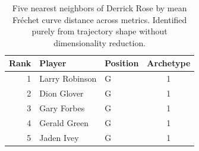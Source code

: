 \begin{table}[htbp]
  \centering\small
  \begin{tabular}{rllc}
    \toprule
    Rank & Player & Position & Archetype \\
    \midrule
    1 & Larry Robinson & G & 1 \\
    2 & Dion Glover & G & 1 \\
    3 & Gary Forbes & G & 1 \\
    4 & Gerald Green & G & 1 \\
    5 & Jaden Ivey & G & 1 \\
    \bottomrule
  \end{tabular}
  \caption{Five nearest neighbors of Derrick Rose by mean Fr\'{e}chet curve distance across metrics. Identified purely from trajectory shape without dimensionality reduction.}
  \label{tab:Derrick_Rose_frechet_curve_neighbors}
\end{table}

